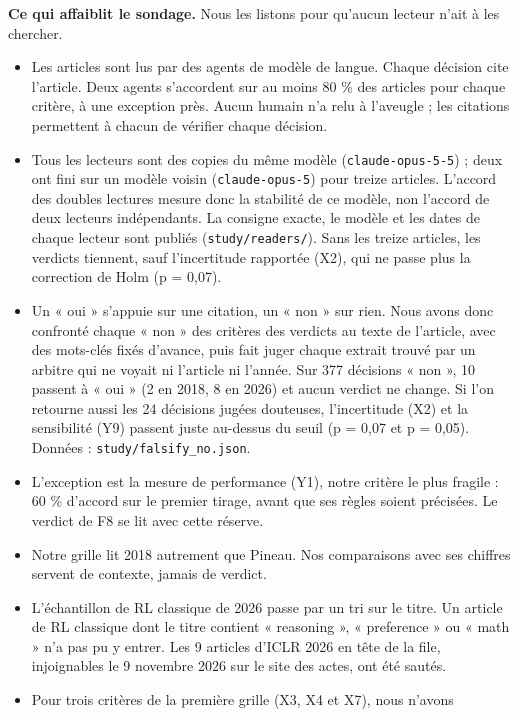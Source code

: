 \documentclass[11pt,a4paper]{article}
\providecommand{\tightlist}{\setlength{\itemsep}{0pt}\setlength{\parskip}{0pt}}
\begin{document}
\textbf{Ce qui affaiblit le sondage.} Nous les listons pour qu'aucun
lecteur n'ait à les chercher.

\begin{itemize}
\tightlist
\item
  Les articles sont lus par des agents de modèle de langue. Chaque
  décision cite l'article. Deux agents s'accordent sur au moins 80 \%
  des articles pour chaque critère, à une exception près. Aucun humain
  n'a relu à l'aveugle ; les citations permettent à chacun de vérifier
  chaque décision.
\item
  Tous les lecteurs sont des copies du même modèle
  (\texttt{claude-opus-5-5}) ; deux ont fini sur un modèle voisin
  (\texttt{claude-opus-5}) pour treize articles. L'accord des doubles
  lectures mesure donc la stabilité de ce modèle, non l'accord de deux
  lecteurs indépendants. La consigne exacte, le modèle et les dates de
  chaque lecteur sont publiés (\texttt{study/readers/}). Sans les treize
  articles, les verdicts tiennent, sauf l'incertitude rapportée (X2),
  qui ne passe plus la correction de Holm (p = 0,07).
\item
  Un « oui » s'appuie sur une citation, un « non » sur rien. Nous avons
  donc confronté chaque « non » des critères des verdicts au texte de
  l'article, avec des mots-clés fixés d'avance, puis fait juger chaque
  extrait trouvé par un arbitre qui ne voyait ni l'article ni l'année.
  Sur 377 décisions « non », 10 passent à « oui » (2 en 2018, 8 en 2026)
  et aucun verdict ne change. Si l'on retourne aussi les 24 décisions
  jugées douteuses, l'incertitude (X2) et la sensibilité (Y9) passent
  juste au-dessus du seuil (p = 0,07 et p = 0,05). Données :
  \texttt{study/falsify\_no.json}.
\item
  L'exception est la mesure de performance (Y1), notre critère le plus
  fragile : 60 \% d'accord sur le premier tirage, avant que ses règles
  soient précisées. Le verdict de F8 se lit avec cette réserve.
\item
  Notre grille lit 2018 autrement que Pineau. Nos comparaisons avec ses
  chiffres servent de contexte, jamais de verdict.
\item
  L'échantillon de RL classique de 2026 passe par un tri sur le titre.
  Un article de RL classique dont le titre contient « reasoning », «
  preference » ou « math » n'a pas pu y entrer. Les 9 articles d'ICLR
  2026 en tête de la file, injoignables le 9 novembre 2026 sur le site
  des actes, ont été sautés.
\item
  Pour trois critères de la première grille (X3, X4 et X7), nous n'avons

\end{itemize}
\end{document}
